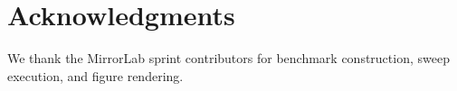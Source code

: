 \documentclass{article}
\begin{document}
\section*{Acknowledgments}
We thank the MirrorLab sprint contributors for benchmark construction,
sweep execution, and figure rendering.




\appendix

\end{document}
